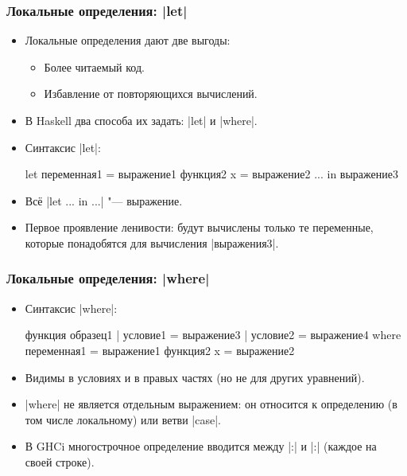 \documentclass[10pt]{beamer}
\begin{document}
\begin{frame}[fragile]
  \frametitle{Локальные определения: \haskinline|let|}
  \begin{itemize}
    \item Локальные определения дают две выгоды:
          \begin{itemize}
            \item Более читаемый код.
            \item Избавление от повторяющихся вычислений.
          \end{itemize}
    \item В Haskell два способа их задать: \haskinline|let| и \haskinline|where|.
    \item Синтаксис \haskinline|let|:
          \begin{haskell}
            let переменная1 = выражение1
                функция2 x = выражение2
                ...
            in выражение3
          \end{haskell}
    \item Всё \haskinline|let ... in ...| "--- выражение.
    \item Первое проявление ленивости: будут вычислены только те переменные, которые понадобятся для вычисления \haskinline|выражения3|.
  \end{itemize}
\end{frame}

\begin{frame}[fragile]
  \frametitle{Локальные определения: \haskinline|where|}
  \begin{itemize}
    \item Синтаксис \haskinline|where|:
          \begin{haskell}
            функция образец1 | условие1 = выражение3
                             | условие2 = выражение4
                where переменная1 = выражение1
                      функция2 x = выражение2
          \end{haskell}
    \item Видимы в условиях и в правых частях (но не для других уравнений).
    \item \haskinline|where| не является отдельным выражением: он относится к определению (в том числе локальному) или ветви \haskinline|case|.
    \item В GHCi многострочное определение вводится между \ghcinline|:{| и \ghcinline|:}| (каждое на своей строке).
  \end{itemize}
\end{frame}
\end{document}
